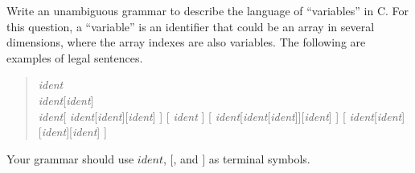 \documentclass[10pt]{article}
\begin{document}
Write an unambiguous grammar to describe the language of 
``variables'' in C.
For this question, a ``variable'' is an identifier
that could be an array in several dimensions,
where the array indexes are also variables.
The following are examples of legal sentences.
\begin{quote}
  \emph{ident} \\
  \emph{ident}[\emph{ident}] \\
  \emph{ident}[ \emph{ident}[\emph{ident}][\emph{ident}] ]
  [ \emph{ident} ]
  [ \emph{ident}[\emph{ident}[\emph{ident}]][\emph{ident}] ]
  [ \emph{ident}[\emph{ident}][\emph{ident}][\emph{ident}] ]
\end{quote}
Your grammar should use $\mathit{ident}$, $[$, and $]$ as
terminal symbols.
\end{document}
